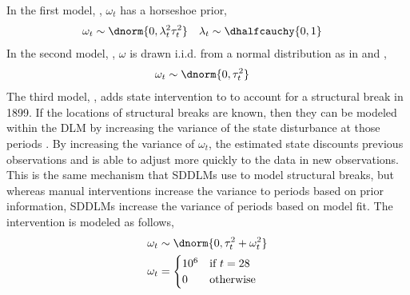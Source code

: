 In the first model, , $\omega_{t}$ has a horseshoe prior,
\begin{equation}
  \label{dlm:eq:22}
  \begin{aligned}[t]
    \omega_{t} & \sim \dnorm{0, \lambda^{2}_{t} \tau_{t}^{2}} & \lambda_{t} & \sim \dhalfcauchy{0, 1}
  \end{aligned}
\end{equation}
In the second model, , $\omega$ is  drawn i.i.d. from a normal distribution as in \textcite{DurbinKoopman2001} and \textcite{petris2011state},
\begin{equation}
  \label{dlm:eq:9}
  \begin{aligned}[t]
    \omega_{t} & \sim \dnorm{0, \tau_{t}^{2}}
  \end{aligned}
\end{equation}
The third model, , adds state intervention to  to account for a structural break in 1899.
If the locations of structural breaks are known, then they can be modeled within the DLM by increasing the variance of the state disturbance at those periods \textcite[Chapter 11][]{WestHarrison1997}.
By increasing the variance of $\omega_{t}$, the estimated state discounts previous observations and is able to adjust more quickly to the data in new observations.
This is the same mechanism that SDDLMs use to model structural breaks, but whereas manual interventions increase the variance to periods based on prior information, SDDLMs increase the variance of periods based on model fit.
The intervention is modeled as follows,
\begin{equation}
  \label{dlm:eq:12}
  \begin{aligned}[t]
    \omega_{t} & \sim \dnorm{0, \tau_{t}^{2} + \omega_{t}^{2}} \\
    \omega_{t} & = 
    \begin{cases}
      10^{6} & \text{if $t = 28$} \\
      0 & \text{otherwise}
    \end{cases}
  \end{aligned}
\end{equation}

